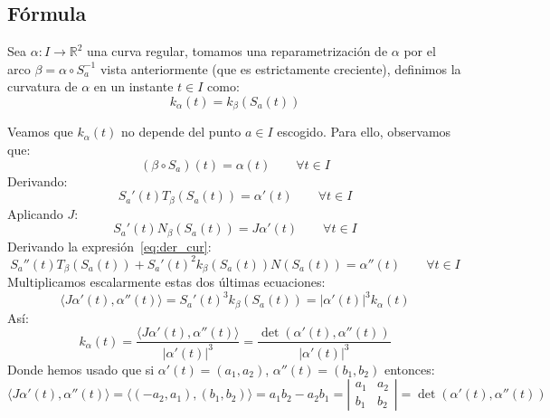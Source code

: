 \subsection{Fórmula}
\begin{definicion}
    Sea $\alpha:I\to \mathbb{R}^2$ una curva regular, tomamos una reparametrización de $\alpha$ por el arco $\beta = \alpha\circ S_a^{-1}$ vista anteriormente (que es estrictamente creciente), definimos la curvatura de $\alpha$ en un instante $t\in I$ como:
    \begin{equation*}
        k_\alpha(t) = k_{\beta}(S_a(t))
    \end{equation*}
\end{definicion}

\noindent
Veamos que $k_{\alpha}(t)$ no depende del punto $a\in I$ escogido. Para ello, observamos que:
\begin{equation*}
    (\beta\circ S_a)(t) = \alpha(t) \qquad \forall t\in I
\end{equation*}
Derivando:
\begin{equation}\label{eq:der_cur}
    S_a'(t)T_\beta(S_a(t)) = \alpha'(t) \qquad \forall t\in I
\end{equation}
Aplicando $J$:
\begin{equation*}
    S_a'(t)N_\beta(S_a(t)) = J\alpha'(t) \qquad \forall t\in I
\end{equation*}
Derivando la expresión~\eqref{eq:der_cur}:
\begin{equation*}
    S_a''(t)T_\beta(S_a(t)) + S_a'(t)^2 k_\beta(S_a(t))N(S_a(t)) = \alpha''(t) \qquad \forall t\in I
\end{equation*}
Multiplicamos escalarmente estas dos últimas ecuaciones:
\begin{equation*}
    \langle J\alpha'(t),\alpha''(t) \rangle = S_a'(t)^3 k_\beta(S_a(t)) = |\alpha'(t)|^3 k_\alpha(t)
\end{equation*}
Así:
\begin{equation*}
    \boxed{k_\alpha(t) = \frac{\langle J\alpha'(t),\alpha''(t) \rangle }{|\alpha'(t)|^3} = \frac{\det(\alpha'(t), \alpha''(t))}{|\alpha'(t)|^3}}
\end{equation*}
Donde hemos usado que si $\alpha'(t) = (a_1, a_2)$, $\alpha''(t) = (b_1, b_2)$ entonces:
\begin{equation*}
    \langle J\alpha'(t), \alpha''(t) \rangle  = \langle (-a_2, a_1), (b_1,b_2) \rangle = a_1b_2 - a_2b_1 = \left|\begin{array}{cc}
         a_1 & a_2 \\
         b_1 & b_2
    \end{array}\right| = \det(\alpha'(t), \alpha''(t))
\end{equation*}

